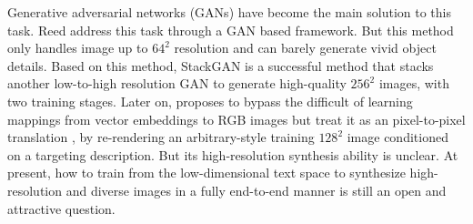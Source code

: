 \documentclass[10pt,twocolumn,letterpaper]{article}
\begin{document}
Generative adversarial networks (GANs) have become the main solution to this task. 
Reed \etal \cite{reed2016generative} address this task through a GAN based framework. But this method only handles image up to $64^2$ resolution and can barely generate vivid object details.
Based on this method, StackGAN  \cite{han2017stackgan} is a successful method that stacks another low-to-high resolution GAN to generate high-quality $256^2$ images, with two training stages. Later on, \cite{dong2017semantic} proposes to bypass the difficult of learning mappings from vector embeddings to RGB images but treat it as an pixel-to-pixel translation \cite{isola2016image}, by re-rendering an arbitrary-style training $128^2$ image conditioned on a targeting description. But its high-resolution synthesis ability is unclear. 
At present, how to train from the low-dimensional text space to synthesize high-resolution and diverse images in a fully end-to-end manner is still an open and attractive question. 
\end{document}

